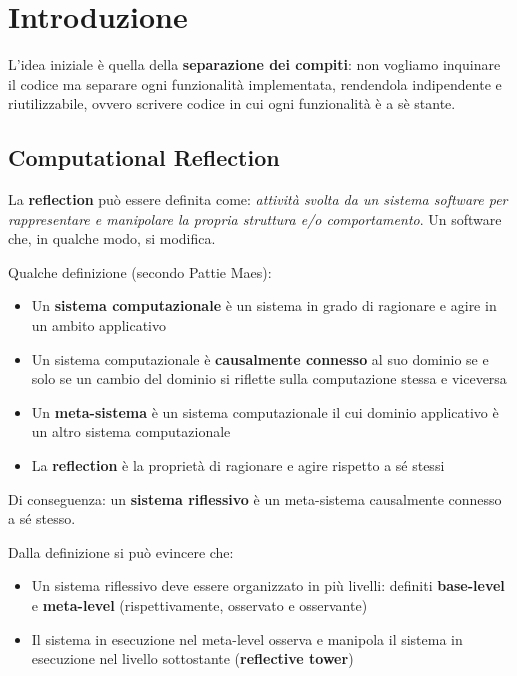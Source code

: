 \section{Introduzione}

L'idea iniziale è quella della \textbf{separazione dei compiti}: non vogliamo inquinare il codice ma separare ogni funzionalità implementata, rendendola indipendente e riutilizzabile, ovvero scrivere codice in cui ogni funzionalità è a sè stante.


\subsection{Computational Reflection}

La \textbf{reflection} può essere definita come: \textit{attività svolta da un sistema software per rappresentare e manipolare la propria struttura e/o comportamento}. Un software che, in qualche modo, si modifica.

Qualche definizione (secondo Pattie Maes):
\begin{itemize}
	\item Un \textbf{sistema computazionale} è un sistema in grado di ragionare e agire in un ambito applicativo
	
	\item Un sistema computazionale è \textbf{causalmente connesso} al suo dominio se e solo se un cambio del dominio si riflette sulla computazione stessa e viceversa
	
	\item Un \textbf{meta-sistema} è un sistema computazionale il cui dominio applicativo è un altro sistema computazionale
	
	\item La \textbf{reflection} è la proprietà di ragionare e agire rispetto a sé stessi
\end{itemize}

Di conseguenza: un \textbf{sistema riflessivo} è un meta-sistema causalmente connesso a sé stesso.

Dalla definizione si può evincere che:
\begin{itemize}
	\item Un sistema riflessivo deve essere organizzato in più livelli: definiti \textbf{base-level} e \textbf{meta-level} (rispettivamente, osservato e osservante)
	
	\item Il sistema in esecuzione nel meta-level osserva e manipola il sistema in esecuzione nel livello sottostante (\textbf{reflective tower})	
\end{itemize}

